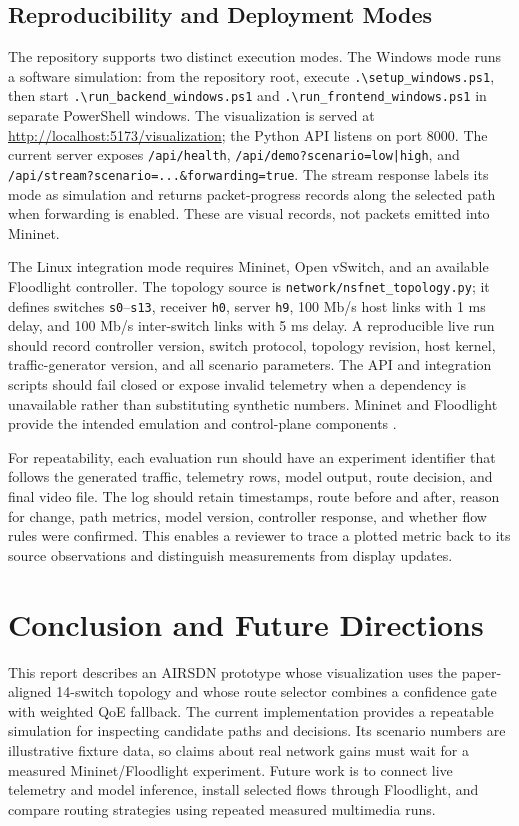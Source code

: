 \documentclass[conference]{IEEEtran}
\begin{document}
\subsection{Reproducibility and Deployment Modes}
The repository supports two distinct execution modes. The Windows mode runs a software simulation: from the repository root, execute \verb|.\setup_windows.ps1|, then start \verb|.\run_backend_windows.ps1| and \verb|.\run_frontend_windows.ps1| in separate PowerShell windows. The visualization is served at \url{http://localhost:5173/visualization}; the Python API listens on port 8000. The current server exposes \texttt{/api/health}, \texttt{/api/demo?scenario=low|high}, and \texttt{/api/stream?scenario=...\&forwarding=true}. The stream response labels its mode as simulation and returns packet-progress records along the selected path when forwarding is enabled. These are visual records, not packets emitted into Mininet.

The Linux integration mode requires Mininet, Open vSwitch, and an available Floodlight controller. The topology source is \texttt{network/nsfnet\_topology.py}; it defines switches \texttt{s0}--\texttt{s13}, receiver \texttt{h0}, server \texttt{h9}, 100 Mb/s host links with 1 ms delay, and 100 Mb/s inter-switch links with 5 ms delay. A reproducible live run should record controller version, switch protocol, topology revision, host kernel, traffic-generator version, and all scenario parameters. The API and integration scripts should fail closed or expose invalid telemetry when a dependency is unavailable rather than substituting synthetic numbers. Mininet and Floodlight provide the intended emulation and control-plane components \cite{mininet,floodlight}.

For repeatability, each evaluation run should have an experiment identifier that follows the generated traffic, telemetry rows, model output, route decision, and final video file. The log should retain timestamps, route before and after, reason for change, path metrics, model version, controller response, and whether flow rules were confirmed. This enables a reviewer to trace a plotted metric back to its source observations and distinguish measurements from display updates.

\section{Conclusion and Future Directions}
This report describes an AIRSDN prototype whose visualization uses the paper-aligned 14-switch topology and whose route selector combines a confidence gate with weighted QoE fallback. The current implementation provides a repeatable simulation for inspecting candidate paths and decisions. Its scenario numbers are illustrative fixture data, so claims about real network gains must wait for a measured Mininet/Floodlight experiment. Future work is to connect live telemetry and model inference, install selected flows through Floodlight, and compare routing strategies using repeated measured multimedia runs.
\end{document}
